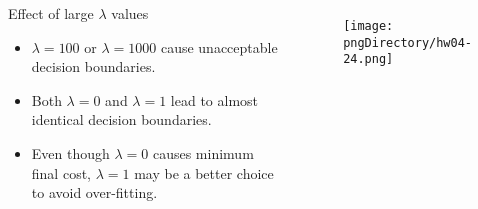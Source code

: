 \documentclass[aspectratio=169]{beamer}
\begin{document}
\begin{slide}

	\begin{columns}

	\begin{block}{Effect of large $\lambda$ values}
	\begin{itemize}
	\item $\lambda = 100$ or $\lambda = 1000$ cause unacceptable decision boundaries.
	\item Both $\lambda = 0$ and $\lambda = 1$ lead to almost identical decision boundaries.
	\item Even though $\lambda = 0$ causes minimum final cost, $\lambda = 1$ may be a better choice to avoid over-fitting.
	\end{itemize}
	\end{block}

	\begin{figure}
	\texttt{[image: \\pngDirectory/hw04-24.png]}
	\end{figure}

	\end{columns}

\end{slide}
\end{document}
